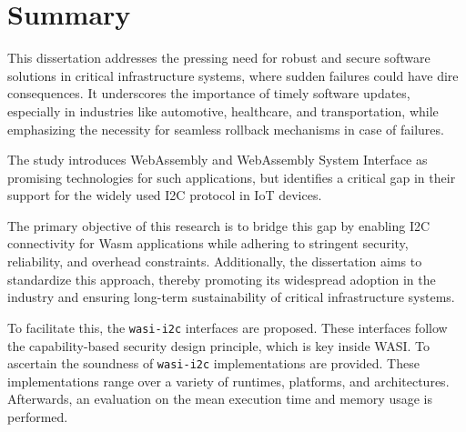 \chapter*{Summary}

This dissertation addresses the pressing need for robust and secure software solutions in critical infrastructure systems, where sudden failures could have dire consequences. It underscores the importance of timely software updates, especially in industries like automotive, healthcare, and transportation, while emphasizing the necessity for seamless rollback mechanisms in case of failures. 

The study introduces WebAssembly and WebAssembly System Interface as promising technologies for such applications, but identifies a critical gap in their support for the widely used I2C protocol in IoT devices. 

The primary objective of this research is to bridge this gap by enabling I2C connectivity for Wasm applications while adhering to stringent security, reliability, and overhead constraints. Additionally, the dissertation aims to standardize this approach, thereby promoting its widespread adoption in the industry and ensuring long-term sustainability of critical infrastructure systems.

To facilitate this, the \texttt{wasi-i2c} interfaces are proposed. These interfaces follow the capability-based security design principle, which is key inside WASI. To ascertain the soundness of \texttt{wasi-i2c} implementations are provided. These implementations range over a variety of runtimes, platforms, and architectures. Afterwards, an evaluation on the mean execution time and memory usage is performed.


